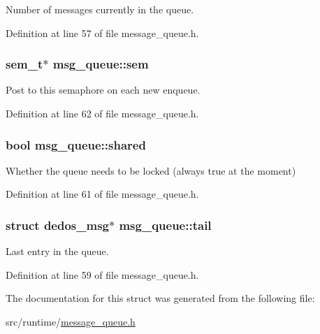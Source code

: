 Number of messages currently in the queue. 



Definition at line 57 of file message\-\_\-queue.\-h.

\hypertarget{structmsg__queue_a0f479c0b10867953149ee7906b4e9cd5}{
\subsubsection[{sem}]{\setlength{\rightskip}{0pt plus 5cm}sem\-\_\-t$\ast$ msg\-\_\-queue\-::sem}}\label{structmsg__queue_a0f479c0b10867953149ee7906b4e9cd5}


Post to this semaphore on each new enqueue. 



Definition at line 62 of file message\-\_\-queue.\-h.

\hypertarget{structmsg__queue_a3cc4b1124f85c79730b77b54ca562d14}{
\subsubsection[{shared}]{\setlength{\rightskip}{0pt plus 5cm}bool msg\-\_\-queue\-::shared}}\label{structmsg__queue_a3cc4b1124f85c79730b77b54ca562d14}


Whether the queue needs to be locked (always true at the moment) 



Definition at line 61 of file message\-\_\-queue.\-h.

\hypertarget{structmsg__queue_a2f86574faae863bc2bf58d3aaa235e23}{
\subsubsection[{tail}]{\setlength{\rightskip}{0pt plus 5cm}struct {\bf dedos\-\_\-msg}$\ast$ msg\-\_\-queue\-::tail}}\label{structmsg__queue_a2f86574faae863bc2bf58d3aaa235e23}


Last entry in the queue. 



Definition at line 59 of file message\-\_\-queue.\-h.



The documentation for this struct was generated from the following file\-:\begin{DoxyCompactItemize}
\item 
src/runtime/\hyperlink{message__queue_8h}{message\-\_\-queue.\-h}\end{DoxyCompactItemize}
